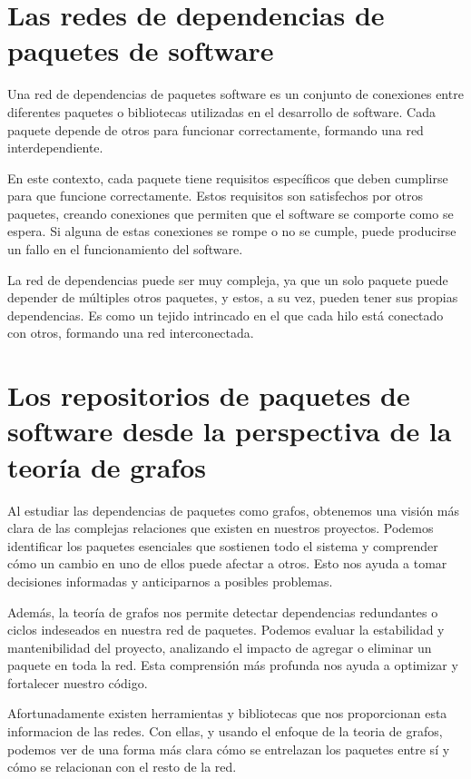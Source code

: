 \section{Las redes de dependencias de paquetes de software}

Una red de dependencias de paquetes software es un conjunto de conexiones entre diferentes paquetes o bibliotecas utilizadas en el desarrollo de software. Cada paquete depende de otros para funcionar correctamente, formando una red interdependiente.

En este contexto, cada paquete tiene requisitos específicos que deben cumplirse para que funcione correctamente. Estos requisitos son satisfechos por otros paquetes, creando conexiones que permiten que el software se comporte como se espera. Si alguna de estas conexiones se rompe o no se cumple, puede producirse un fallo en el funcionamiento del software.

La red de dependencias puede ser muy compleja, ya que un solo paquete puede depender de múltiples otros paquetes, y estos, a su vez, pueden tener sus propias dependencias. Es como un tejido intrincado en el que cada hilo está conectado con otros, formando una red interconectada.

\section{Los repositorios de paquetes de software desde la perspectiva de la teoría de grafos}

Al estudiar las dependencias de paquetes como grafos, obtenemos una visión más clara de las complejas relaciones que existen en nuestros proyectos. Podemos identificar los paquetes esenciales que sostienen todo el sistema y comprender cómo un cambio en uno de ellos puede afectar a otros. Esto nos ayuda a tomar decisiones informadas y anticiparnos a posibles problemas.

Además, la teoría de grafos nos permite detectar dependencias redundantes o ciclos indeseados en nuestra red de paquetes. Podemos evaluar la estabilidad y mantenibilidad del proyecto, analizando el impacto de agregar o eliminar un paquete en toda la red. Esta comprensión más profunda nos ayuda a optimizar y fortalecer nuestro código.

Afortunadamente existen herramientas y bibliotecas que nos proporcionan esta informacion de las redes. Con ellas, y usando el enfoque de la teoria de grafos, podemos ver de una forma más clara cómo se entrelazan los paquetes entre sí y cómo se relacionan con el resto de la red.

